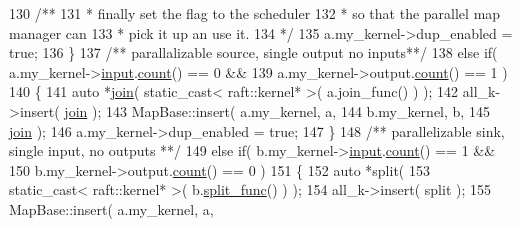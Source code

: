 \begin{DoxyCode}
130 \textcolor{comment}{                              /**}
131 \textcolor{comment}{                               * finally set the flag to the scheduler}
132 \textcolor{comment}{                               * so that the parallel map manager can}
133 \textcolor{comment}{                               * pick it up an use it.}
134 \textcolor{comment}{                               */}
135                               a.my\_kernel->dup\_enabled = \textcolor{keyword}{true};
136                            \}\textcolor{comment}{}
137 \textcolor{comment}{                           /** parallalizable source, single output no inputs**/}
138                            \textcolor{keywordflow}{else} \textcolor{keywordflow}{if}( a.my\_kernel->\hyperlink{classraft_1_1kernel_a6edbe35a56409d402e719b3ac36d6554}{input}.\hyperlink{class_port_a33562ea87ac7e83a32441da40cbd9279}{count}() == 0 &&
139                                     a.my\_kernel->output.\hyperlink{class_port_a33562ea87ac7e83a32441da40cbd9279}{count}() == 1 )
140                            \{
141                               \textcolor{keyword}{auto} *\hyperlink{class_map_base_a2624d7b81f0078dcc78e524045403e28}{join}( static\_cast< raft::kernel* >( a.join\_func() ) );
142                               all\_k->insert( \hyperlink{class_map_base_a2624d7b81f0078dcc78e524045403e28}{join} );
143                               MapBase::insert( a.my\_kernel, a,
144                                                b.my\_kernel, b,
145                                                \hyperlink{class_map_base_a2624d7b81f0078dcc78e524045403e28}{join} );
146                               a.my\_kernel->dup\_enabled = \textcolor{keyword}{true};
147                            \}\textcolor{comment}{}
148 \textcolor{comment}{                           /** parallelizable sink, single input, no outputs **/}
149                            \textcolor{keywordflow}{else} \textcolor{keywordflow}{if}( b.my\_kernel->\hyperlink{classraft_1_1kernel_a6edbe35a56409d402e719b3ac36d6554}{input}.\hyperlink{class_port_a33562ea87ac7e83a32441da40cbd9279}{count}() == 1 &&
150                                     b.my\_kernel->output.\hyperlink{class_port_a33562ea87ac7e83a32441da40cbd9279}{count}() == 0 )
151                            \{
152                               \textcolor{keyword}{auto} *split(
153                                  static\_cast< raft::kernel* >( b.\hyperlink{struct_port_info_a6b7e8758b84288a4378233251252be77}{split\_func}() ) );
154                               all\_k->insert( split );
155                               MapBase::insert( a.my\_kernel, a,

\end{DoxyCode}
